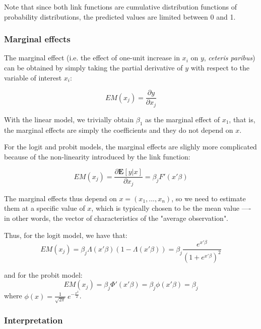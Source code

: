 Note that since both link functions are cumulative distribution functions of probability distributions, the predicted values are limited between 0 and 1.

\subsubsection{Marginal effects}
The marginal effect (i.e. the effect of one-unit increase in $x_i$ on $y$, \textit{ceteris paribus}) can be obtained by simply taking the partial derivative of $y$ with respect to the variable of interest $x_i$:

\begin{equation}
    EM(x_j) = \frac{\partial y}{\partial x_j}
\end{equation}

With the linear model, we trivially obtain $\beta_1$ as the marginal effect of $x_1$, that is, the marginal effects are simply the coefficients and they do not depend on $x$.

For the logit and probit models, the marginal effects are slighly more complicated because of the non-linearity introduced by the link function:

\begin{equation}
    EM(x_j) = \frac{\partial \mathbf{E}[y|x]}{\partial x_j} = \beta_j F'(x'\beta)
\end{equation}

The marginal effects thus depend on $x = (x_1, ..., x_n)$, so we need to estimate them at a specific value of $x$, which is typically chosen to be the mean value ––- in other words, the vector of characteristics of the "average observation".

Thus, for the logit model, we have that:
$$
    EM(x_j) = \beta_j\Lambda(x'\beta)(1-\Lambda(x'\beta)) = \beta_j\frac{e^{x'\beta}}{(1+e^{x'\beta})^2}
$$

and for the probit model:
$$
    EM(x_j) = \beta_j\Phi'(x'\beta) = \beta_j\phi(x'\beta) = \beta_j
$$
where $\phi(x) = \frac{1}{\sqrt{2\pi}}\ e^{-\frac{x^2}{2}}$.

\subsubsection{Interpretation}

